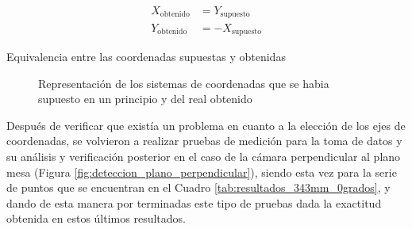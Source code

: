   \begin{myequation}[H]
    \begin{align}
      X_{\text{obtenido}} &= Y_{\text{supuesto}}
      \nonumber \\
      Y_{\text{obtenido}} &= -X_{\text{supuesto}}  
      \nonumber
    \end{align}
    \caption{Equivalencia entre las coordenadas supuestas y obtenidas}
    \label{ec:equivalencia_resultados}
  \end{myequation}


  \begin{figure}[H]
      \begin{center}
        \subcapcentertrue
        \hspace{1mm}
      \end{center}
      \caption{Representación de los sistemas de coordenadas que se habia supuesto en un principio y del real obtenido}
      \label{fig:sistemas_coordenadas}
    \end{figure}

Después de verificar que existía un problema en cuanto a la elección de los ejes de coordenadas, se volvieron a realizar pruebas de medición para la toma de datos y su análisis y verificación posterior en el caso de la cámara perpendicular al plano mesa (Figura \ref{fig:deteccion_plano_perpendicular}), siendo esta vez para la serie de puntos que se encuentran en el Cuadro \ref{tab:resultados_343mm_0grados}, y dando de esta manera por terminadas este tipo de pruebas dada la exactitud obtenida en estos últimos resultados.

